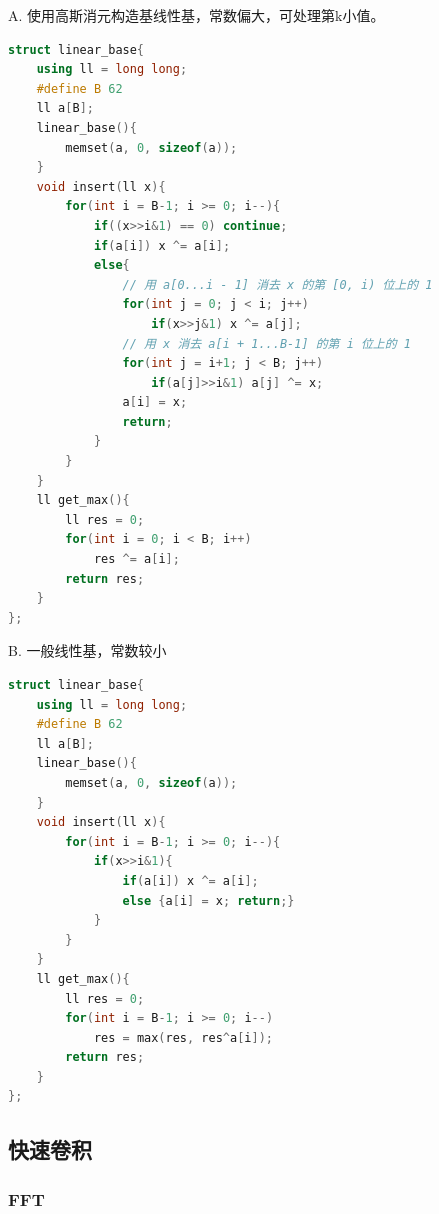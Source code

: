 A. 使用高斯消元构造基线性基，常数偏大，可处理第k小值。
\begin{lstlisting}[language = C++]
struct linear_base{
    using ll = long long;
    #define B 62
    ll a[B];
    linear_base(){
        memset(a, 0, sizeof(a));
    }
    void insert(ll x){
        for(int i = B-1; i >= 0; i--){
            if((x>>i&1) == 0) continue;
            if(a[i]) x ^= a[i];
            else{
                // 用 a[0...i - 1] 消去 x 的第 [0, i) 位上的 1
                for(int j = 0; j < i; j++)
                    if(x>>j&1) x ^= a[j];
                // 用 x 消去 a[i + 1...B-1] 的第 i 位上的 1
                for(int j = i+1; j < B; j++)
                    if(a[j]>>i&1) a[j] ^= x;
                a[i] = x;
                return;
            }
        }
    }
    ll get_max(){
        ll res = 0;
        for(int i = 0; i < B; i++)
            res ^= a[i];
        return res;
    }
};
\end{lstlisting}

B. 一般线性基，常数较小
\begin{lstlisting}[language = C++]
struct linear_base{
    using ll = long long;
    #define B 62
    ll a[B];
    linear_base(){
        memset(a, 0, sizeof(a));
    }
    void insert(ll x){
        for(int i = B-1; i >= 0; i--){
            if(x>>i&1){
                if(a[i]) x ^= a[i];
                else {a[i] = x; return;}
            }
        }
    }
    ll get_max(){
        ll res = 0;
        for(int i = B-1; i >= 0; i--)
            res = max(res, res^a[i]);
        return res;
    }
};
\end{lstlisting}

\subsection{快速卷积}

\subsubsection{FFT}

